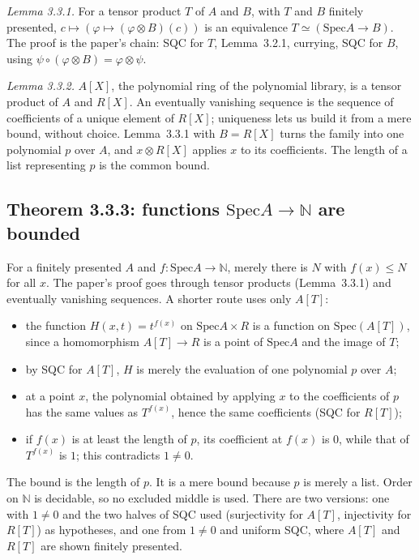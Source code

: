 \documentclass[11pt]{article}
\newcommand{\Spec}{\mathrm{Spec}}
\theoremstyle{remark}
\begin{document}
\emph{Lemma 3.3.1.} For a tensor product $T$ of $A$ and $B$, with $T$ and
$B$ finitely presented, $c\mapsto(\varphi\mapsto(\varphi\otimes B)(c))$
is an equivalence $T\simeq(\Spec A\to B)$. The proof is the paper's
chain: SQC for $T$, Lemma~3.2.1, currying, SQC for $B$, using
$\psi\circ(\varphi\otimes B)=\varphi\otimes\psi$.

\emph{Lemma 3.3.2.} $A[X]$, the polynomial ring of the polynomial
library, is a tensor product of $A$ and $R[X]$. An eventually vanishing
sequence is the sequence of coefficients of a unique element of $R[X]$;
uniqueness lets us build it from a mere bound, without choice. Lemma~3.3.1
with $B=R[X]$ turns the family into one polynomial $p$ over $A$, and
$x\otimes R[X]$ applies $x$ to its coefficients. The length of a list
representing $p$ is the common bound.

\subsection*{Theorem 3.3.3: functions $\Spec A\to\mathbb N$ are bounded}

For a finitely presented $A$ and $f:\Spec A\to\mathbb N$, merely there is
$N$ with $f(x)\le N$ for all $x$. The paper's proof goes through tensor
products (Lemma~3.3.1) and eventually vanishing sequences. A shorter route
uses only $A[T]$:
\begin{itemize}
\item the function $H(x,t)=t^{f(x)}$ on $\Spec A\times R$ is a function on
  $\Spec(A[T])$, since a homomorphism $A[T]\to R$ is a point of $\Spec A$
  and the image of $T$;
\item by SQC for $A[T]$, $H$ is merely the evaluation of one polynomial
  $p$ over $A$;
\item at a point $x$, the polynomial obtained by applying $x$ to the
  coefficients of $p$ has the same values as $T^{f(x)}$, hence the same
  coefficients (SQC for $R[T]$);
\item if $f(x)$ is at least the length of $p$, its coefficient at
  $f(x)$ is $0$, while that of $T^{f(x)}$ is $1$; this contradicts
  $1\ne0$.
\end{itemize}
The bound is the length of $p$. It is a mere bound because $p$ is merely
a list. Order on $\mathbb N$ is decidable, so no excluded middle is used.
There are two versions: one with $1\neq0$ and the two halves of SQC used
(surjectivity for $A[T]$, injectivity for $R[T]$) as hypotheses, and one
from $1\ne0$ and uniform SQC, where $A[T]$ and $R[T]$ are shown finitely
presented.
\end{document}
